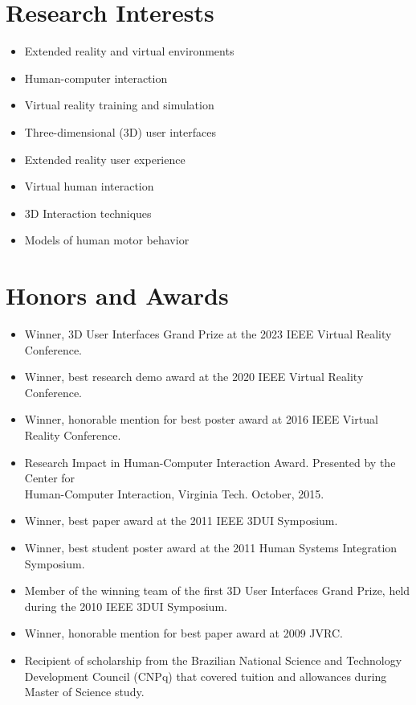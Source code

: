 \documentclass[wideaddress]{vitae}
\begin{document}
\section{Research Interests}
\begin{itemize}
	\item{Extended reality and virtual environments}
	\item{Human-computer interaction}
	\item{Virtual reality training and simulation}
	\item{Three-dimensional (3D) user interfaces}
	\item{Extended reality user experience}
	\item{Virtual human interaction}
	\item{3D Interaction techniques}
	\item{Models of human motor behavior}
\end{itemize}

\section{Honors and Awards}
\begin{itemize}
	\item{Winner, 3D User Interfaces Grand Prize at the 2023 IEEE Virtual Reality Conference.}
	\item{Winner, best research demo award at the 2020 IEEE Virtual Reality Conference.}
	\item{Winner, honorable mention for best poster award at 2016 IEEE Virtual Reality Conference.}
	\item{Research Impact in Human-Computer Interaction Award. Presented by the Center for\\Human-Computer Interaction, Virginia Tech. October, 2015.}
	\item{Winner, best paper award at the 2011 IEEE 3DUI Symposium.}
	\item{Winner, best student poster award at the 2011 Human Systems Integration Symposium.}
	\item{Member of the winning team of the first 3D User Interfaces Grand Prize, held during the 2010 IEEE 3DUI Symposium.}
	\item{Winner, honorable mention for best paper award at 2009 JVRC.}
	\item{Recipient of scholarship from the Brazilian National Science and Technology Development Council (CNPq) that covered tuition and allowances during Master of Science study.}
\end{itemize}
\end{document}
